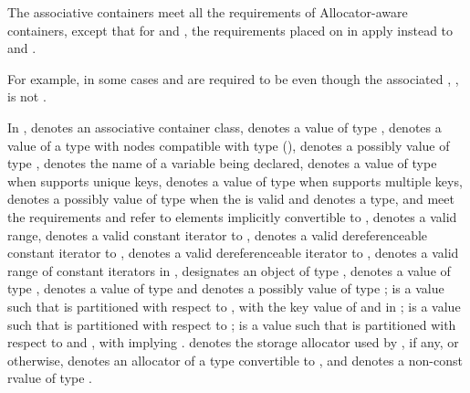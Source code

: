 \pnum
The associative containers meet all the requirements of Allocator-aware
containers, except that for
 and , the requirements placed on 
in  apply instead to 
and .
\begin{note}
For example, in some cases  and 
are required to be  even though the associated
, , is not
.
\end{note}

\pnum
In ,
 denotes an associative container class,
 denotes a value of type ,
 denotes a value of a type with nodes compatible with type
 (),
 denotes a possibly  value of type ,
 denotes the name of a variable being declared,
 denotes a value of type 
when  supports unique keys,
 denotes a value of type 
when  supports multiple keys,
 denotes a possibly  value of type 
when the 
 is valid
and denotes a type,
 and 
meet the  requirements and refer to elements
implicitly convertible to
, 
denotes a valid range,
 denotes a valid constant iterator to ,
 denotes a valid dereferenceable constant iterator to ,
 denotes a valid dereferenceable iterator to ,
\tcode{[q1, q2)} denotes a valid range of constant iterators in ,
 designates an object of type ,
 denotes a value of type ,
 denotes a value of type 
and  denotes a possibly  value of type ;
 is a value such that  is partitioned
with respect to , with  the key value of 
and  in ;
 is a value such that  is partitioned with respect to
;
 is a value such that  is partitioned with respect to
 and , with  implying
.
 denotes the storage allocator used by , if any, or  otherwise,
 denotes an allocator of a type convertible to ,
and  denotes a non-const rvalue of type .


